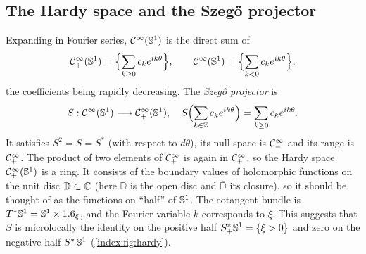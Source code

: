 \subsection{The Hardy space and the Szeg\H{o} projector}
Expanding in Fourier series, $\mathcal{C}^\infty(\mathbb{S}^1)$ is the direct sum of
\begin{equation*}
  \mathcal{C}^\infty_{+}(\mathbb{S}^1)=\Bigl\{\sum_{k\ge0}c_ke^{ik\theta}\Bigr\},\qquad
  \mathcal{C}^\infty_{-}(\mathbb{S}^1)=\Bigl\{\sum_{k<0}c_ke^{ik\theta}\Bigr\},
\end{equation*}
the coefficients being rapidly decreasing. The \emph{Szeg\H{o} projector} is
\begin{equation}\label{index:eq:szego}
  S:\mathcal{C}^\infty(\mathbb{S}^1)\longrightarrow\mathcal{C}^\infty_{+}(\mathbb{S}^1),\quad
  S\Bigl(\sum_{k\in\mathbb{Z}}c_ke^{ik\theta}\Bigr)=\sum_{k\ge0}c_ke^{ik\theta}.
\end{equation}
It satisfies $S^2=S=S^*$ (with respect to $d\theta$), its null space is
$\mathcal{C}^\infty_{-}$ and its range is $\mathcal{C}^\infty_{+}$. The product of two elements of $\mathcal{C}^\infty_{+}$ is
again in $\mathcal{C}^\infty_{+}$, so the Hardy space $\mathcal{C}^\infty_{+}(\mathbb{S}^1)$ is a ring. It
consists of the boundary values of holomorphic functions on the unit disc
$\mathbb D\subset\mathbb{C}$ (here $\mathbb{D}$ is the open disc and
$\overline{\mathbb D}$ its closure), so it should be thought of as the
functions on ``half'' of $\mathbb{S}^1$. The cotangent bundle is
$T^*\mathbb{S}^1=\mathbb{S}^1\times1.6_\xi$, and the Fourier variable $k$
corresponds to $\xi$. This suggests that $S$ is microlocally the identity on
the positive half $S^*_+\mathbb{S}^1=\{\xi>0\}$ and zero on the negative half
$S^*_-\mathbb{S}^1$ (\cref{index:fig:hardy}).

